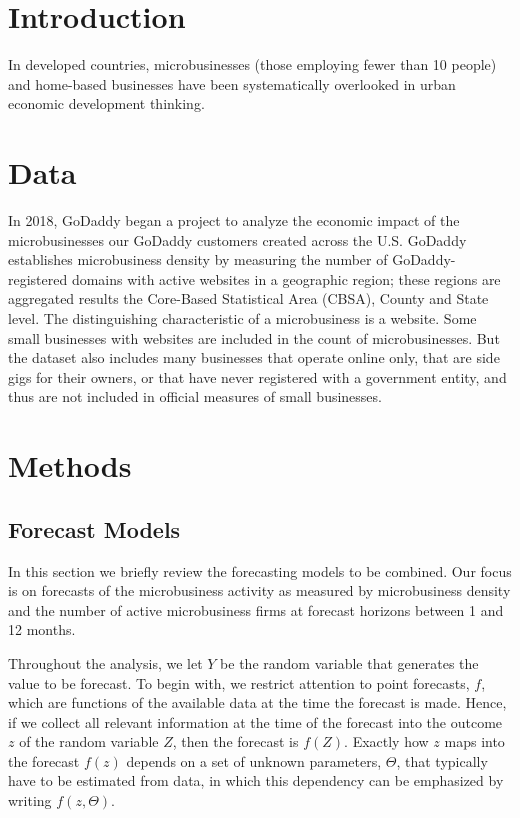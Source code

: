 \documentclass[
a4paper, %
12pt, %
]{CascadeAnalyticsWPS}
\begin{document}
	\newpage

\section{Introduction}
	
In developed countries, microbusinesses (those employing fewer than 10 people) and home-based businesses have been systematically overlooked in urban economic development thinking.
\section{Data}
In 2018, GoDaddy began a project to analyze the economic impact of the microbusinesses our GoDaddy customers created across the U.S. GoDaddy establishes microbusiness density by measuring the number of GoDaddy-registered domains with active websites in a geographic region; these regions are aggregated results the Core-Based Statistical Area (CBSA), County and State level. The distinguishing characteristic of a microbusiness is a website. Some small businesses with websites are included in the count of microbusinesses. But the dataset also includes many businesses that operate online only, that are side gigs for their owners, or that have never registered with a government entity, and thus are not included in official measures of small businesses.

\section{Methods}
\label{sec:sec3}
\subsection{Forecast Models}
\label{sec:sec3.1}
In this section we briefly review the forecasting models to be combined. Our focus is on forecasts of the microbusiness activity as measured by microbusiness density and the number of active microbusiness firms at forecast horizons between 1 and 12 months.

Throughout the analysis, we let $Y$ be the random variable that generates the value to
be forecast. To begin with, we restrict attention to point forecasts, $f$, which are functions
of the available data at the time the forecast is made. Hence, if we collect all relevant
information at the time of the forecast into the outcome $z$ of the random variable $Z$, then the forecast is $f(Z)$. Exactly how $z$ maps into the forecast $f(z)$ depends on a set of unknown parameters, $\Theta$, that typically have to be estimated from data, in which this dependency can be emphasized by writing $f(z, \Theta)$.
\end{document}
